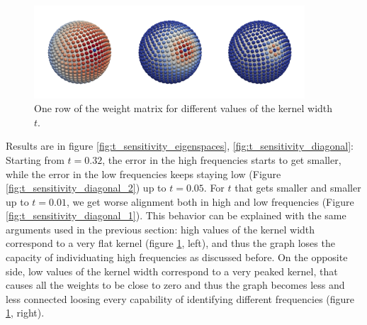 \begin{figure}[h!]
	\centering
	\includegraphics[width=0.9\textwidth]{figs/chapter1/t.png}	
	\caption{\label{fig:weights}One row of the weight matrix for different values of the kernel width $t$.}
\end{figure}

Results are in figure \ref{fig:t_sensitivity_eigenspaces}, \ref{fig:t_sensitivity_diagonal}: Starting from $t=0.32$, the error in the high frequencies starts to get smaller, while the error in the low frequencies keeps staying low (Figure \ref{fig:t_sensitivity_diagonal_2}) up to $t=0.05$. For $t$ that gets smaller and smaller up to $t=0.01$, we get worse alignment both in high and low frequencies (Figure \ref{fig:t_sensitivity_diagonal_1}). This behavior can be explained with the same arguments used in the previous section: high values of the kernel width correspond to a very flat kernel (figure \ref{fig:weights}, left), and thus the graph loses the capacity of individuating high frequencies as discussed before. On the opposite side, low values of the kernel width correspond to a very peaked kernel, that causes all the weights to be close to zero and thus the graph becomes less and less connected loosing every capability of identifying different frequencies  (figure \ref{fig:weights}, right). 

